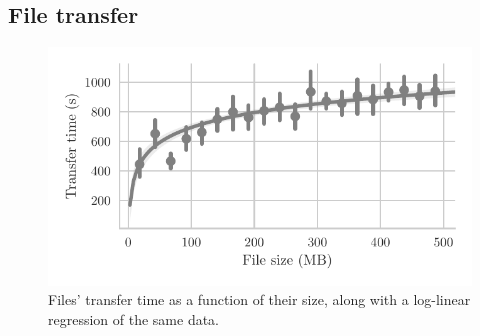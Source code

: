 \subsection{File transfer} %
\label{sub:file_transfer}

\begin{figure}[t]
\centering
\includegraphics[width=0.9\columnwidth]{figures/transfer_time_vs_size.pdf}

\caption{\label{fig:transfer_time_vs_size}Files' transfer time as a function of their size, along with a log-linear regression of the same data.}
\end{figure}


